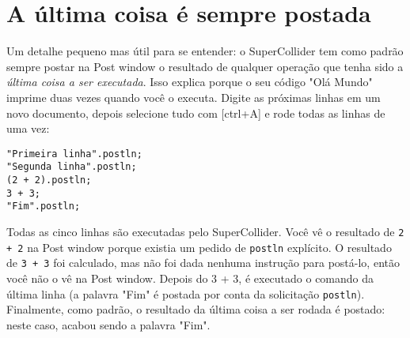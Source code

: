 \section{A última coisa é sempre postada}

Um detalhe pequeno mas útil para se entender: o SuperCollider tem como padrão sempre postar na Post window o resultado de qualquer operação que tenha sido a \emph{última coisa a ser executada}. Isso explica porque o seu código "Olá Mundo" imprime duas vezes quando você o executa. Digite as próximas linhas em um novo documento, depois selecione tudo com [ctrl+A] e rode todas as linhas de uma vez:

\begin{lstlisting}[style=SuperCollider-IDE, basicstyle=\scttfamily\footnotesize]
"Primeira linha".postln;
"Segunda linha".postln;
(2 + 2).postln;
3 + 3;
"Fim".postln;
\end{lstlisting}

Todas as cinco linhas são executadas pelo SuperCollider. Você vê o resultado de \texttt{2 + 2} na Post window porque existia um pedido de \texttt{postln} explícito. O resultado de \texttt{3 + 3} foi calculado, mas não foi dada nenhuma instrução para postá-lo, então você não o vê na Post window. Depois do 3 + 3, é executado o comando da última linha (a palavra "Fim" é postada por conta da solicitação \texttt{postln}). Finalmente, como padrão, o resultado da última coisa a ser rodada é postado: neste caso, acabou sendo a palavra "Fim".
